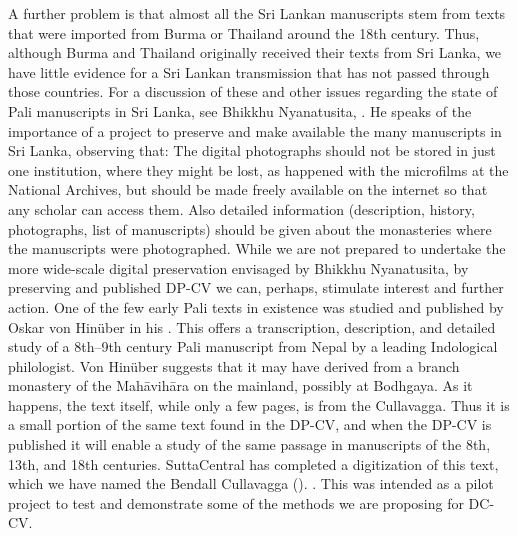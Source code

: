 {}A further problem is that almost all the Sri Lankan manuscripts stem from texts that were imported from Burma or Thailand around the 18th century. Thus, although Burma and Thailand originally received their texts from Sri Lanka, we have little evidence for a Sri Lankan transmission that has not passed through those countries. For a discussion of these and other issues regarding the state of Pali manuscripts in Sri Lanka, see Bhikkhu Nyanatusita, . He speaks of the importance of a project to preserve and make available the many manuscripts in Sri Lanka, observing that:\markdownRendererInterblockSeparator
{}\markdownRendererBlockQuoteBegin
The digital photographs should not be stored in just one institution, where they might be lost, as happened with the microfilms at the National Archives, but should be made freely available on the internet so that any scholar can access them. Also detailed information (description, history, photographs, list of manuscripts) should be given about the monasteries where the manuscripts were photographed.
\markdownRendererBlockQuoteEnd \markdownRendererInterblockSeparator
{}While we are not prepared to undertake the more wide-scale digital preservation envisaged by Bhikkhu Nyanatusita, by preserving and published DP-CV we can, perhaps, stimulate interest and further action.\markdownRendererInterblockSeparator
{}One of the few early Pali texts in existence was studied and published by Oskar von Hinüber in his . This offers a transcription, description, and detailed study of a 8th–9th century Pali manuscript from Nepal by a leading Indological philologist. Von Hinüber suggests that it may have derived from a branch monastery of the Mahāvihāra on the mainland, possibly at Bodhgaya. As it happens, the text itself, while only a few pages, is from the Cullavagga. Thus it is a small portion of the same text found in the DP-CV, and when the DP-CV is published it will enable a study of the same passage in manuscripts of the 8th, 13th, and 18th centuries. SuttaCentral has completed a digitization of this text, which we have named the Bendall Cullavagga (). . This was intended as a pilot project to test and demonstrate some of the methods we are proposing for DC-CV.\markdownRendererInterblockSeparator
